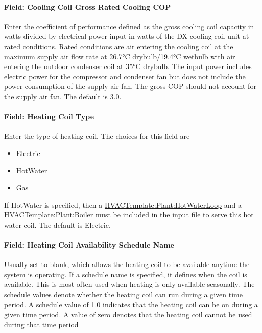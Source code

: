 \paragraph{Field: Cooling Coil Gross Rated Cooling COP}\label{field-cooling-coil-gross-rated-cooling-cop}

Enter the coefficient of performance defined as the gross cooling coil capacity in watts divided by electrical power input in watts of the DX cooling coil unit at rated conditions. Rated conditions are air entering the cooling coil at the maximum supply air flow rate at 26.7°C drybulb/19.4°C wetbulb with air entering the outdoor condenser coil at 35°C drybulb. The input power includes electric power for the compressor and condenser fan but does not include the power consumption of the supply air fan. The gross COP should not account for the supply air fan. The default is 3.0.

\paragraph{Field: Heating Coil Type}\label{field-heating-coil-type-1}

Enter the type of heating coil. The choices for this field are

\begin{itemize}
\item
  Electric
\item
  HotWater
\item
  Gas
\end{itemize}

If HotWater is specified, then a \hyperref[hvactemplateplanthotwaterloop]{HVACTemplate:Plant:HotWaterLoop} and a \hyperref[hvactemplateplantboiler]{HVACTemplate:Plant:Boiler} must be included in the input file to serve this hot water coil. The default is Electric.

\paragraph{Field: Heating Coil Availability Schedule Name}\label{field-heating-coil-availability-schedule-name-1}

Usually set to blank, which allows the heating coil to be available anytime the system is operating. If a schedule name is specified, it defines when the coil is available. This is most often used when heating is only available seasonally. The schedule values denote whether the heating coil can run during a given time period. A schedule value of 1.0 indicates that the heating coil can be on during a given time period. A value of zero denotes that the heating coil cannot be used during that time period

